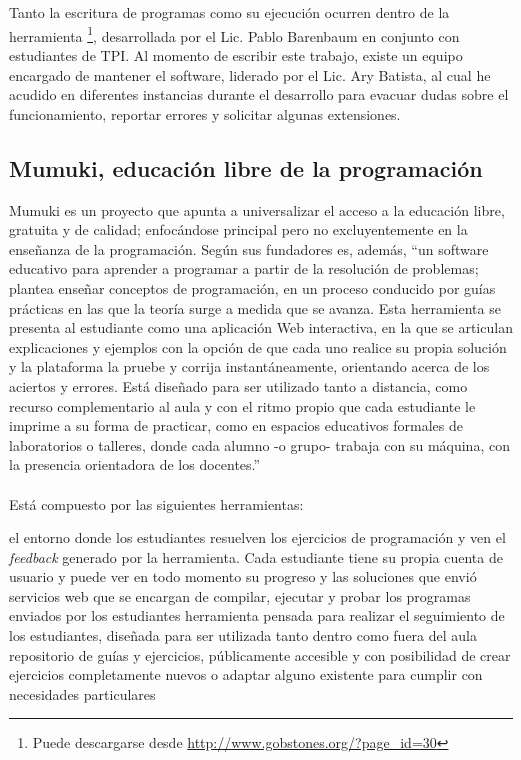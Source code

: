 \\\\
Tanto la escritura de programas como su ejecución ocurren dentro de la herramienta \footnote{Puede descargarse desde \url{http://www.gobstones.org/?page_id=30}}, desarrollada por el Lic. Pablo Barenbaum en conjunto con estudiantes de TPI. Al momento de escribir este trabajo, existe un equipo encargado de mantener el software, liderado por el Lic. Ary Batista, al cual he acudido en diferentes instancias durante el desarrollo para evacuar dudas sobre el funcionamiento, reportar errores y solicitar algunas extensiones.

\subsection{Mumuki, educación libre de la programación}
Mumuki es un proyecto que apunta a universalizar el acceso a la educación libre, gratuita y de calidad; enfocándose principal pero no excluyentemente en la enseñanza de la programación. Según sus fundadores es, además, ``un software educativo para aprender a programar a partir de la resolución de problemas; plantea enseñar conceptos de programación, en un proceso conducido por guías prácticas en las que la teoría surge a medida que se avanza. Esta herramienta se presenta al estudiante como una aplicación Web interactiva, en la que se articulan explicaciones y ejemplos con la opción de que cada uno realice su propia solución y la plataforma la pruebe y corrija instantáneamente, orientando acerca de los aciertos y errores. Está diseñado para ser utilizado tanto a distancia, como recurso complementario al aula y con el ritmo propio que cada estudiante le imprime a su forma de practicar, como en espacios educativos formales de laboratorios o talleres, donde cada alumno -o grupo- trabaja con su máquina, con la presencia orientadora de los docentes.''\cite{PaperMumuki}
\\\\
Está compuesto por las siguientes herramientas:
\begin{itemize}
   el entorno donde los estudiantes resuelven los ejercicios de programación y ven el \textit{feedback} generado por la herramienta. Cada estudiante tiene su propia cuenta de usuario y puede ver en todo momento su progreso y las soluciones que envió
   servicios web que se encargan de compilar, ejecutar y probar los programas enviados por los estudiantes
   herramienta pensada para realizar el seguimiento de los estudiantes, diseñada para ser utilizada tanto dentro como fuera del aula
   repositorio de guías y ejercicios, públicamente accesible y con posibilidad de crear ejercicios completamente nuevos o adaptar alguno existente para cumplir con necesidades particulares
\end{itemize}

